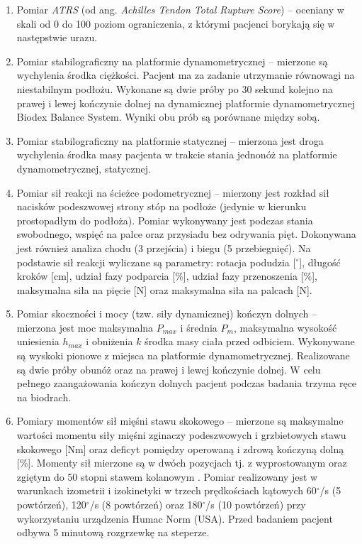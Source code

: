 \begin{enumerate}
	\item Pomiar \textit{ATRS} (od ang. \textit{Achilles Tendon Total Rupture Score}) -- oceniany \linebreak w skali od 0 do 100 \cite{NilssonHelander2007} poziom ograniczenia, z którymi pacjenci borykają się w następstwie urazu.
	\item Pomiar stabilograficzny na platformie dynamometrycznej -- mierzone są wychylenia środka ciężkości. Pacjent ma za zadanie utrzymanie równowagi \linebreak na niestabilnym podłożu. Wykonane są dwie próby po 30 sekund kolejno na prawej i lewej kończynie dolnej na dynamicznej platformie dynamometrycznej Biodex Balance System. Wyniki obu prób są porównane między sobą. 
	\item Pomiar stabilograficzny na platformie statycznej -- mierzona jest droga wychylenia środka masy pacjenta w trakcie stania jednonóż na platformie dynamometrycznej, statycznej.
	\item Pomiar sił reakcji na ścieżce podometrycznej -- mierzony jest rozkład sił nacisków podeszwowej strony stóp na podłoże (jedynie w kierunku prostopadłym do podłoża). Pomiar wykonywany jest podczas stania swobodnego, wspięć \linebreak na palce oraz przysiadu bez odrywania pięt. Dokonywana jest również analiza chodu (3 przejścia) i biegu (5 przebiegnięć). Na podstawie sił reakcji wyliczane są parametry: rotacja podudzia [$^\circ$], długość kroków [cm], udział fazy podparcia [\%], udział fazy przenoszenia [\%], maksymalna siła na pięcie [N] oraz maksymalna siła na palcach [N].
	\item Pomiar skoczności i mocy (tzw. siły dynamicznej) kończyn dolnych -- mierzona jest moc maksymalna $P_{max}$ i średnia $P_m$, maksymalna wysokość uniesienia $h_{max}$ i obniżenia $k$ środka masy ciała przed odbiciem. Wykonywane są wyskoki pionowe z miejsca na platformie dynamometrycznej. Realizowane są dwie próby obunóż oraz na prawej i lewej kończynie dolnej. W celu pełnego zaangażowania kończyn dolnych pacjent podczas badania trzyma ręce na biodrach. 
	\item Pomiary momentów sił mięśni stawu skokowego -- mierzone są maksymalne wartości momentu siły mięśni zginaczy podeszwowych i grzbietowych stawu skokowego [Nm] oraz deficyt pomiędzy operowaną i zdrową kończyną dolną [\%]. Momenty sił mierzone są w dwóch pozycjach tj. z wyprostowanym oraz zgiętym do 50 stopni stawem kolanowym \cite{Orishimo2008}. Pomiar realizowany jest w warunkach izometrii i izokinetyki w trzech prędkościach kątowych 60$^\circ$/s (5 powtórzeń), 120$^\circ$/s (8 powtórzeń) oraz 180$^\circ$/s (10 powtórzeń) przy wykorzystaniu urządzenia Humac Norm (USA). Przed badaniem pacjent odbywa 5 minutową rozgrzewkę na steperze.
\end{enumerate}

